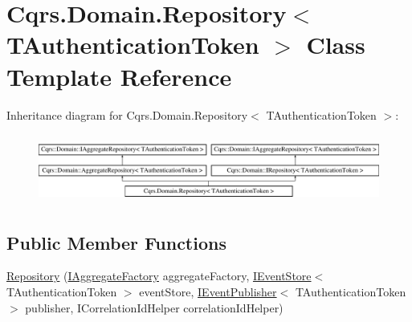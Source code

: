 \hypertarget{classCqrs_1_1Domain_1_1Repository}{}\section{Cqrs.\+Domain.\+Repository$<$ T\+Authentication\+Token $>$ Class Template Reference}
\label{classCqrs_1_1Domain_1_1Repository}
Inheritance diagram for Cqrs.\+Domain.\+Repository$<$ T\+Authentication\+Token $>$\+:\begin{figure}[H]
\begin{center}
\leavevmode
\includegraphics[height=2.288828cm]{classCqrs_1_1Domain_1_1Repository}
\end{center}
\end{figure}
\subsection*{Public Member Functions}
\begin{DoxyCompactItemize}
\item 
\hyperlink{classCqrs_1_1Domain_1_1Repository_ab513757cb27ab3f34a1cd4d5396aa0c1}{Repository} (\hyperlink{interfaceCqrs_1_1Domain_1_1Factories_1_1IAggregateFactory}{I\+Aggregate\+Factory} aggregate\+Factory, \hyperlink{interfaceCqrs_1_1Events_1_1IEventStore}{I\+Event\+Store}$<$ T\+Authentication\+Token $>$ event\+Store, \hyperlink{interfaceCqrs_1_1Events_1_1IEventPublisher}{I\+Event\+Publisher}$<$ T\+Authentication\+Token $>$ publisher, I\+Correlation\+Id\+Helper correlation\+Id\+Helper)
\end{DoxyCompactItemize}
